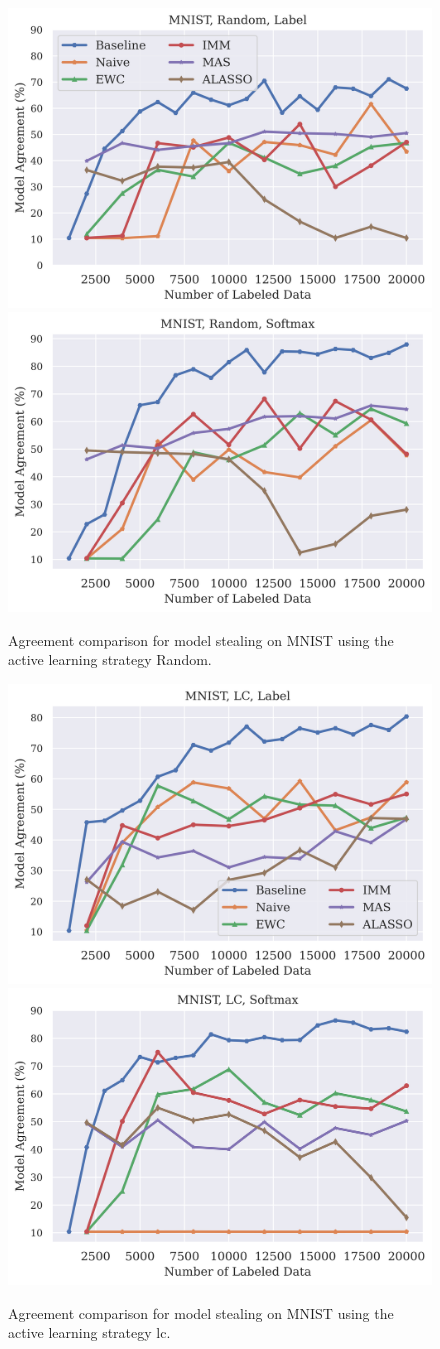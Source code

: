 \begin{figure}[!htb]
    \centering
    \includegraphics[width=0.48\linewidth]{images/results_CALMS/mnist_label_random.png} \hfill
    \includegraphics[width=0.48\linewidth]{images/results_CALMS/mnist_softmax_random.png}
    \caption{Agreement comparison for model stealing on MNIST using the active learning strategy Random.}
    \label{fig:CALMSMNISTRandom}
\end{figure}

\begin{figure}[!htb]
    \centering
    \includegraphics[width=0.48\linewidth]{images/results_CALMS/mnist_label_lc.png} \hfill
    \includegraphics[width=0.48\linewidth]{images/results_CALMS/mnist_softmax_lc.png}
    \caption{Agreement comparison for model stealing on MNIST using the active learning strategy \gls{lc}.}
    \label{fig:CALMSMNISTLC}
\end{figure}

